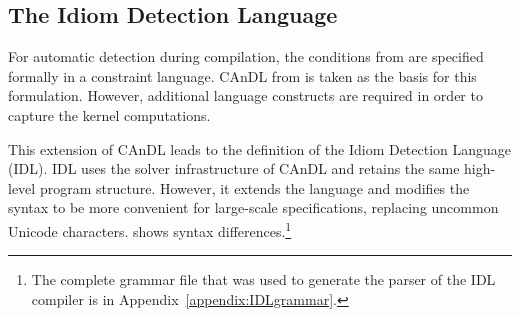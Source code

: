 \subsection{The Idiom Detection Language}

    For automatic detection during compilation, the conditions from
     are specified formally in
    a constraint language.
    CAnDL from  is taken as the basis for this formulation.
    However, additional language constructs are required in order to capture
    the kernel computations.

    This extension of CAnDL leads to the definition of the
    Idiom Detection Language (IDL).
    IDL uses the solver infrastructure of CAnDL and retains the same high-level
    program structure.
    However, it extends the language and modifies the syntax to be more
    convenient for large-scale specifications, replacing uncommon Unicode
    characters.
     shows syntax differences.\footnote{The complete grammar
    file that was used to generate the parser of the IDL compiler is in
    Appendix~\ref{appendix:IDLgrammar}.}

